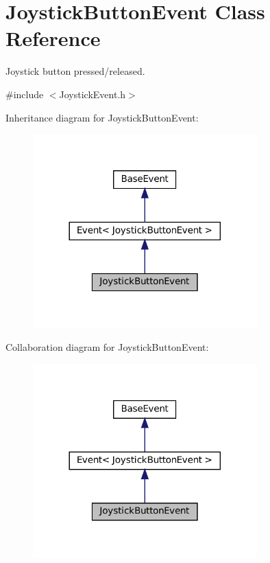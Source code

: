 \hypertarget{classJoystickButtonEvent}{}\section{Joystick\+Button\+Event Class Reference}
\label{classJoystickButtonEvent}


Joystick button pressed/released.  




{\ttfamily \#include $<$Joystick\+Event.\+h$>$}



Inheritance diagram for Joystick\+Button\+Event\+:
\nopagebreak
\begin{figure}[H]
\begin{center}
\leavevmode
\includegraphics[width=245pt]{classJoystickButtonEvent__inherit__graph}
\end{center}
\end{figure}


Collaboration diagram for Joystick\+Button\+Event\+:
\nopagebreak
\begin{figure}[H]
\begin{center}
\leavevmode
\includegraphics[width=245pt]{classJoystickButtonEvent__coll__graph}
\end{center}
\end{figure}
